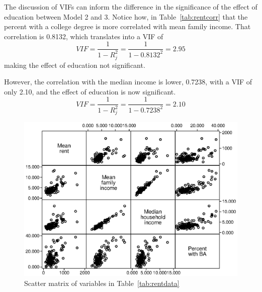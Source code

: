 The discussion of VIFs can inform the difference in the significance of the effect of education between Model 2 and 3. Notice how, in Table~\ref{tab:rentcorr} that the percent with a college degree is more correlated with mean family income. That correlation is 0.8132, which translates into a VIF of
\[
VIF = \frac{1}{1-R^2_j} = \frac{1}{1-0.8132^2}=2.95
\]
making the effect of education not significant.

However, the correlation with the median income is lower, 0.7238, with a VIF of only 2.10, and the effect of education is now significant.
\[
VIF = \frac{1}{1-R^2_j} = \frac{1}{1-0.7238^2}=2.10
\]

\begin{figure}
   \centering
   \includegraphics[angle=0,
           width=1\textwidth]{rent_corr.eps}
   \caption{Scatter matrix of variables in Table~\ref{tab:rentdata}}
  \label{fig:rentmatrix}
\end{figure}

